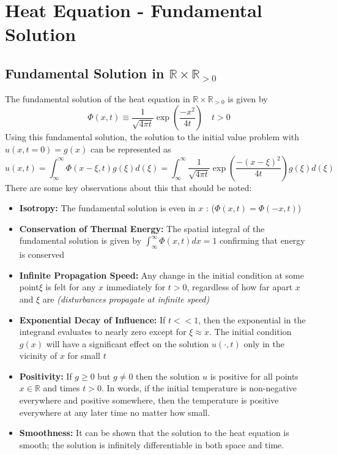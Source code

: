 \documentclass[11pt]{article}
\newcommand{\R}{\mathbb{R}}
\begin{document}
\pagebreak

\section{Heat Equation - Fundamental Solution}

\subsection{Fundamental Solution in $\R \times \R_{>0}$}
The fundamental solution of the heat equation in $\R \times \R_{>0}$ is given by
$$ \Phi(x,t) \equiv  \frac{1}{\sqrt{4\pi t}} \exp \left( \frac{-x^2}{4t} \right) \quad t>0$$ Using this fundamental solution, the solution to the initial value problem with $u(x, t = 0) = g(x)$ can be represented as
$$u(x,t) = \int_{\infty}^{\infty}  \Phi(x - \xi, t) g(\xi) d(\xi) = \int_{\infty}^{\infty}  \frac{1}{\sqrt{4\pi t}} \exp \left( \frac{-(x-\xi)^2}{4t} \right) g(\xi) d(\xi)$$
There are some key observations about this that should be noted:
\begin{itemize}
\item \textbf{Isotropy:} The fundamental solution is even in $x$ : ($ \Phi (x, t) = \Phi (-x, t)$)
\item \textbf{Conservation of Thermal Energy:} The spatial integral of the fundamental solution is given by $ \int_{\infty}^{\infty} \Phi (x, t) dx = 1$ confirming that energy is conserved
\item \textbf{Infinite Propagation Speed:} Any change in the initial condition at some point$\xi$ is felt for any $x$ immediately for $t > 0$, regardless of how far apart $x$ and $\xi$ are \textit{(disturbances propagate at infinite speed)}
\item \textbf{Exponential Decay of Influence:} If $t << 1$, then the exponential in the integrand evaluates to nearly zero except for $\xi \approx x$. The initial condition $g(x)$ will have a significant effect on the solution $u(\cdot , t)$ only in the vicinity of $x$ for small $t$
\item \textbf{Positivity:} If $g \geq 0$ but $g\neq 0$ then the solution $u$ is positive for all points $x \in \R$ and times $t > 0$. In words, if the initial temperature is non-negative everywhere and positive somewhere, then the temperature is positive everywhere at any later time no matter how small.
\item \textbf{Smoothness:} It can be shown that the solution to the heat equation is smooth; the solution is infinitely differentiable in both space and time.
\end{itemize}
\end{document}
